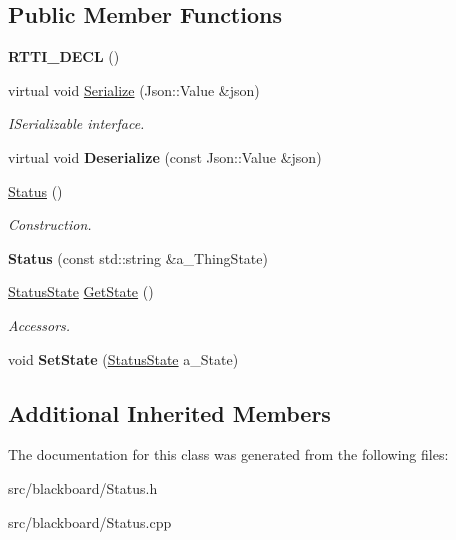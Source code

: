 \subsection*{Public Member Functions}
\begin{DoxyCompactItemize}
\item 
\mbox{\label{class_status_aa4f82dc1b8baefd914ed3a11b50a37cd}} 
{\bfseries R\+T\+T\+I\+\_\+\+D\+E\+CL} ()
\item 
\mbox{\label{class_status_a76a3da2e0b8cd16cc95f6f6bfcdd5737}} 
virtual void \hyperlink{class_status_a76a3da2e0b8cd16cc95f6f6bfcdd5737}{Serialize} (Json\+::\+Value \&json)
\begin{DoxyCompactList}\small\item\em I\+Serializable interface. \end{DoxyCompactList}\item 
\mbox{\label{class_status_a21f186884c6f1fd59c2264abf25ce5c0}} 
virtual void {\bfseries Deserialize} (const Json\+::\+Value \&json)
\item 
\mbox{\label{class_status_a944586fb328a3524805748c8f7b17f32}} 
\hyperlink{class_status_a944586fb328a3524805748c8f7b17f32}{Status} ()
\begin{DoxyCompactList}\small\item\em Construction. \end{DoxyCompactList}\item 
\mbox{\label{class_status_a97b67be4c6ba590bc836cfdfcadd1179}} 
{\bfseries Status} (const std\+::string \&a\+\_\+\+Thing\+State)
\item 
\mbox{\label{class_status_a4f13863f48fc49d7a20f7333ce052af6}} 
\hyperlink{class_status_abefb09daa7775defc3ecc20a6f2cf5bc}{Status\+State} \hyperlink{class_status_a4f13863f48fc49d7a20f7333ce052af6}{Get\+State} ()
\begin{DoxyCompactList}\small\item\em Accessors. \end{DoxyCompactList}\item 
\mbox{\label{class_status_a14875227f52b1f2a157a852237ed0ef5}} 
void {\bfseries Set\+State} (\hyperlink{class_status_abefb09daa7775defc3ecc20a6f2cf5bc}{Status\+State} a\+\_\+\+State)
\end{DoxyCompactItemize}
\subsection*{Additional Inherited Members}


The documentation for this class was generated from the following files\+:\begin{DoxyCompactItemize}
\item 
src/blackboard/Status.\+h\item 
src/blackboard/Status.\+cpp\end{DoxyCompactItemize}

